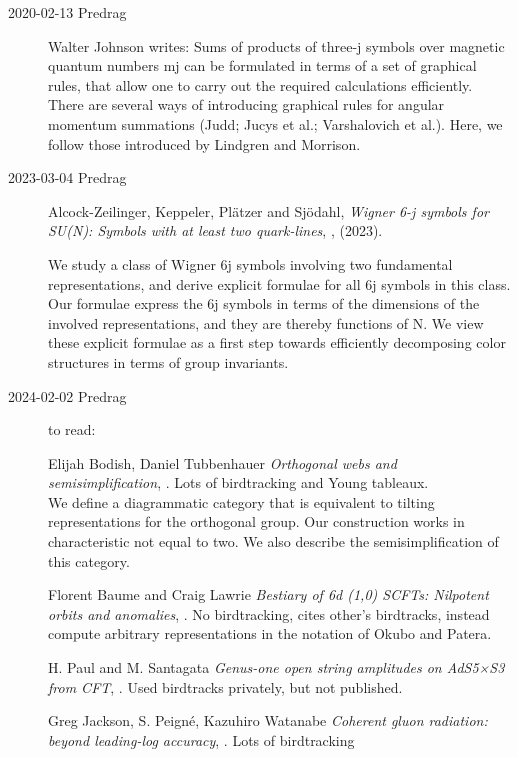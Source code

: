 \begin{description}
 \item[2020-02-13 Predrag]
  {Walter Johnson} writes:
Sums of products of three-j symbols over magnetic quantum numbers mj can
be formulated in terms of a set of graphical rules, that allow one to
carry out the required calculations efficiently. There are several ways
of introducing graphical rules for angular momentum summations
(Judd; Jucys et al.; Varshalovich et
al.). Here, we follow those introduced by Lindgren and
Morrison.

\item[2023-03-04 Predrag]
Alcock-Zeilinger, Keppeler, Pl{\"a}tzer and Sj{\"o}dahl,
{\em Wigner 6-j symbols for SU(N): {Symbols} with at least two quark-lines},
, (2023).

We study a class of  Wigner 6j symbols involving two fundamental
representations, and derive explicit formulae for all 6j symbols in this
class. Our formulae express the 6j symbols in terms of the dimensions of the
involved representations, and they are thereby functions of N. We view these
explicit formulae as a first step towards efficiently decomposing 
color structures in terms of group invariants.

\item[2024-02-02 Predrag] to read:

Elijah Bodish, Daniel Tubbenhauer
{\em Orthogonal webs and semisimplification},
. Lots of birdtracking and Young tableaux.
\\
We define a diagrammatic category that is equivalent to tilting
representations for the orthogonal group. Our construction works in
characteristic not equal to two. We also describe the semisimplification
of this category.

Florent Baume and Craig Lawrie
{\em Bestiary of 6d (1,0) {SCFTs}: {Nilpotent} orbits and anomalies},
.
No birdtracking, cites other's birdtracks, instead compute arbitrary
representations in the notation of Okubo and
Patera.

H. Paul and M. Santagata
{\em Genus-one open string amplitudes on AdS5×S3 from CFT},
.
Used birdtracks privately, but not published.

Greg Jackson, S. Peign\'e, Kazuhiro Watanabe
{\em Coherent gluon radiation: beyond leading-log accuracy},
.
Lots of birdtracking


\end{description}
